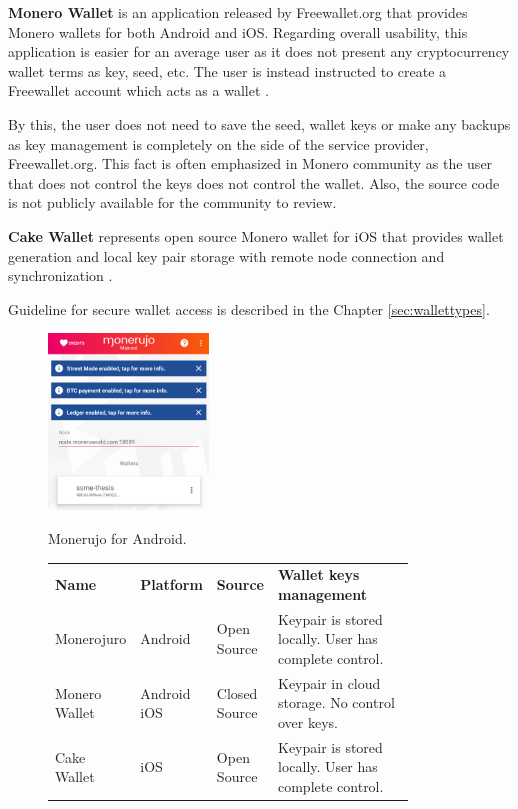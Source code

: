 \documentclass[
  printed, %
  table,   %
  lof,     %
  lot,     %
           oneside, color
]{fithesis3}
\begin{document}
\textbf{Monero Wallet} is an application released by Freewallet.org that provides Monero wallets for both Android and iOS. Regarding overall usability, this application is easier for an average user as it does not present any cryptocurrency wallet terms as key, seed, etc. The user is instead instructed to create a Freewallet account which acts as a wallet \cite{freewallet}. 

By this, the user does not need to save the seed, wallet keys or make any backups as key management is completely on the side of the service provider, Freewallet.org. This fact is often emphasized in Monero community as the user that does not control the keys does not control the wallet. Also, the source code is not publicly available for the community to review.

\textbf{Cake Wallet} represents open source Monero wallet for iOS that provides wallet generation and local key pair storage with remote node connection and synchronization \cite{cakewalletgithub}.

Guideline for secure wallet access is described in the Chapter \ref{sec:wallettypes}. 
    \vspace{-1.3em}
\begin{figure}[H]
\begin{center}
\vspace{-0.75em}
 \includegraphics[trim={0 1.8cm 0 0},clip,width=0.38\textwidth]{Screenshot_1542566492.png}
    \caption{Monerujo for Android.}
    \vspace{-1.5em}
    \label{pic:withoutresdrawable}
\end{center}
    \end{figure}
 \vspace{-0.9em}
\begin{figure}[H]
\centering\begin{tabular}{p{0.2\linewidth}p{0.15\linewidth}p{0.1\linewidth}p{0.4\linewidth}}
\textbf{Name}         & \textbf{Platform}      & \textbf{Source}        & \textbf{Wallet keys management} \\
Monerojuro    & Android       & Open Source   & Keypair is stored locally.  User has complete control.                      \\
Monero \linebreak Wallet & Android  iOS & Closed Source & Keypair in cloud storage. No control over keys. \\
Cake Wallet   & iOS           & Open Source   & Keypair is stored locally.  User has complete control.                           
\end{tabular}
\label{table:monero-mobile}
\end{figure}
\end{document}
